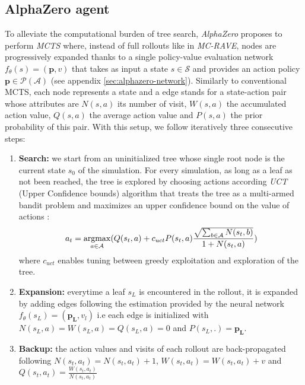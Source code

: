 \documentclass[journal, a4paper]{IEEEtran}
\newcommand{\argmax}{\operatornamewithlimits{argmax}}
\begin{document}
\subsection{AlphaZero agent}
\label{ssec:alphazero}
    To alleviate the computational burden of tree search, \textit{AlphaZero}\cite{alphazero} proposes to perform \textit{MCTS} where, instead of full rollouts like in \textit{MC-RAVE}, nodes are progressively expanded thanks to a single policy-value evaluation network $f_\theta(s)=(\mathbf{p}, v)$ that takes as input a state $s\in \mathcal{S}$ and provides an action policy $\mathbf{p}\in\mathcal{P}(\mathcal{A})$ (see appendix \ref{sec:alphazero-network}). Similarly to conventional MCTS, each node represents a state and a edge stands for a state-action pair whose attributes are $N(s,a)$ its number of visit, $W(s,a)$ the accumulated action value, $Q(s,a)$ the average action value and $P(s,a)$ the prior probability of this pair. With this setup, we follow iteratively three consecutive steps:
    \begin{enumerate}
        \item \textbf{Search:} we start from an uninitialized tree whose single root node is the current state $s_0$ of the simulation. For every simulation, as long as a leaf as not been reached, the tree is explored by choosing actions according \textit{UCT} (Upper Confidence bounds) algorithm that treats the tree as a multi-armed bandit problem and maximizes an upper confidence bound on the value of actions : $$a_t=\argmax_{a\in\mathcal{A}}(Q(s_t, a)+c_{uct}P(s_t,a)\frac{\sqrt{\sum_{b\in\mathcal{A}}N(s_t, b)}}{1+N(s_t,a)})$$ where $c_{uct}$ enables tuning between greedy exploitation and exploration of the tree.
        \item \textbf{Expansion:} everytime a leaf $s_L$ is encountered in the rollout, it is expanded by adding edges following the estimation provided by the neural network $f_\theta(s_L)=(\mathbf{p_L}, v_l)$ i.e each edge is initialized with $N(s_L, a)=W(s_L,a)=Q(s_L,a)=0$ and $P(s_L,.)=\mathbf{p_L}$.
        \item \textbf{Backup:} the action values and visits of each rollout are back-propagated following $N(s_t, a_t) = N(s_t, a_t) + 1$, $W(s_t, a_t) = W(s_t, a_t) + v$ and $Q(s_t, a_t)=\frac{W(s_t, a_t)}{N(s_t, a_t)}$
    \end{enumerate}
\end{document}
